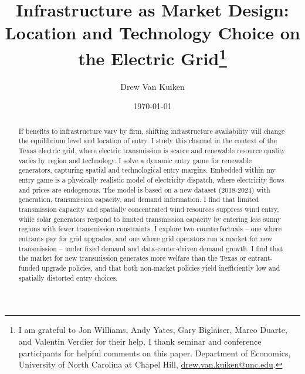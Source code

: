 \documentclass[12pt]{article}
\title{Infrastructure as Market Design: Location and Technology Choice on the Electric Grid\footnote{I am grateful to Jon Williams, Andy Yates, Gary Biglaiser, Marco Duarte, and Valentin Verdier for their help. I thank seminar and conference participants for helpful comments on this paper. Department of Economics, University of North Carolina at Chapel Hill, \href{mailto:drew.van.kuiken@unc.edu}{drew.van.kuiken@unc.edu}.}}
\author{Drew Van Kuiken}
\date{\today}
\begin{document}
\maketitle

\begin{abstract}

\onehalfspacing 
\noindent If benefits to infrastructure vary by firm, shifting infrastructure availability will change the equilibrium level and location of entry. I study this channel in the context of the Texas electric grid, where electric transmission is scarce and renewable resource quality varies by region and technology. I solve a dynamic entry game for renewable generators, capturing spatial and technological entry margins. Embedded within my entry game is a physically realistic model of electricity dispatch, where electricity flows and prices are endogenous. The model is based on a new dataset (2018-2024) with generation, transmission capacity, and demand information. I find that limited transmission capacity and spatially concentrated wind resources suppress wind entry, while solar generators respond to limited transmission capacity by entering less sunny regions with fewer transmission constraints. I explore two counterfactuals -- one where entrants pay for grid upgrades, and one where grid operators run a market for new transmission -- under fixed demand and data-center-driven demand growth. I find that the market for new transmission generates more welfare than the Texas or entrant-funded upgrade policies, and that both non-market policies yield inefficiently low and spatially distorted entry choices.


\end{abstract}
\end{document}
